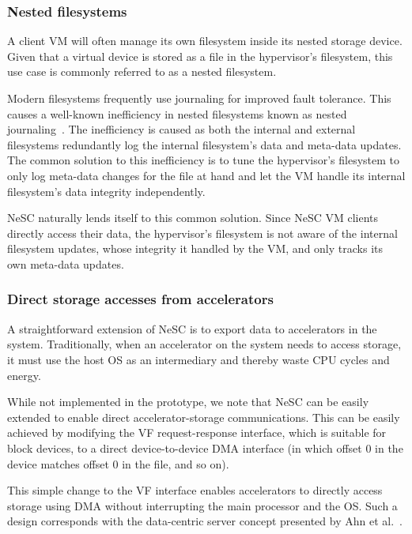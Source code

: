 \subsubsection*{Nested filesystems}
A client VM will often manage its own filesystem inside its nested storage device. Given that a virtual device is stored as a file in the hypervisor's filesystem, this use case is commonly referred to as a nested filesystem.

Modern filesystems frequently use journaling for improved fault tolerance. This causes a well-known inefficiency in nested filesystems known as nested journaling~\cite{le12nested}. The inefficiency is caused as both the internal and external filesystems redundantly log the internal filesystem's data and meta-data updates. The common solution to this inefficiency is to tune the hypervisor's filesystem to only log meta-data changes for the file at hand and let the VM handle its internal filesystem's data integrity independently.

NeSC naturally lends itself to this common solution. Since NeSC VM clients directly access their data, the hypervisor's filesystem is not aware of the internal filesystem updates, whose integrity it handled by the VM, and only tracks its own meta-data updates.

\subsubsection*{Direct storage accesses from accelerators}

A straightforward extension of NeSC is to export data to accelerators in the system.
Traditionally, when an accelerator on the system needs to access storage, it must use the host OS as an intermediary and thereby waste CPU cycles and energy.

While not implemented in the prototype, we note that NeSC can be easily extended to enable direct accelerator-storage communications. This can be easily achieved by modifying the VF request-response interface, which is suitable for block devices, to a direct device-to-device DMA interface (in which offset 0 in the device matches offset 0 in the file, and so on).

This simple change to the VF interface enables accelerators to directly access storage using DMA without interrupting the main processor and the OS. Such a design corresponds with the data-centric server concept presented by Ahn et al.~\cite{ahn2015dcs}.



